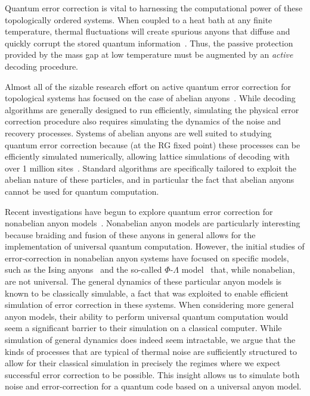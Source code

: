 \documentclass[aps, prl, letterpaper, twocolumn, superscriptaddress, notitlepage, 10pt]{revtex4-1}
\begin{document}
Quantum error correction is vital to harnessing the computational power of these topologically 
ordered systems. When coupled to a heat bath at any finite temperature, thermal fluctuations 
will create spurious anyons that diffuse and quickly corrupt the stored quantum 
information~\cite{Pastawski2010}. Thus, the passive protection provided by the mass gap 
at low temperature must be augmented by an \emph{active} decoding procedure. 

Almost all of the sizable research effort on active quantum error correction for topological 
systems has focused on the case of abelian anyons~\cite{Dennis2002, Duclos-Cianci2010, Duclos-Cianci2010a, Wang2010, Wang2010a, Duclos-Cianci2013, Bravyi2011, Bombin2012, Wootton2012, Anwar2014, Watson2014, Hutter2014a, Bravyi2014, Wootton2015, Andrist2015}.
While decoding algorithms are generally designed to run efficiently, simulating the physical error correction procedure also requires simulating the dynamics of the noise and recovery processes. 
Systems of abelian anyons are well suited to studying quantum error correction because (at the RG fixed point) these processes can be efficiently simulated numerically, allowing lattice 
simulations of decoding with over 1 million sites~\cite{Duclos-Cianci2010}. 
Standard algorithms are specifically tailored to exploit the abelian nature of these particles, and in particular the fact that abelian anyons cannot be used for quantum computation. 

Recent investigations have begun to explore quantum error correction for nonabelian anyon 
models~\cite{Brell2013, Wootton2013, Hutter2014}. Nonabelian anyon models are particularly interesting 
because braiding and fusion of these anyons in general allows for the implementation of universal quantum 
computation. However, the initial studies of error-correction in nonabelian anyon systems have focused on specific models, such as the Ising 
anyons~\cite{Brell2013} and the so-called $\Phi$-$\Lambda$ 
model~\cite{Wootton2013, Hutter2014} that, while nonabelian, are not universal. The general dynamics of these particular anyon models is known to be classically simulable, a fact
that was exploited to enable efficient simulation of error correction in these systems. When considering more general anyon models, their ability to perform universal quantum computation would seem a significant barrier to their simulation on a classical computer. While simulation of general dynamics does indeed seem intractable, we argue that the kinds of processes that are typical of thermal noise are sufficiently structured to allow for their classical simulation in precisely the regimes where we expect successful error correction to be possible. This insight allows us to simulate both noise and error-correction for a quantum code based on a universal anyon model.
\end{document}
